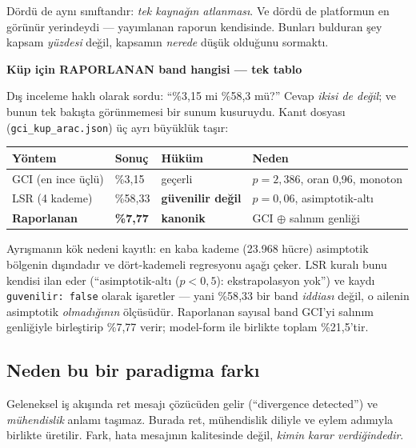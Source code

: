 \documentclass[11pt,a4paper]{article}
\newcommand{\kkkenar}{lacivert}
\newcommand{\kkzemin}{kod}
\newenvironment{renkkutu}[3]{%
  \renewcommand{\kkkenar}{#1}\renewcommand{\kkzemin}{#2}%
  \par\medskip\noindent
  \begin{lrbox}{\kutugovde}%
  \begin{minipage}{\dimexpr\linewidth-2\fboxsep-2\fboxrule\relax}\footnotesize
  \textcolor{#1}{\textbf{#3}}\par\vspace{3pt}%
}{%
  \end{minipage}%
  \end{lrbox}%
  \noindent\fcolorbox{\kkkenar}{\kkzemin}{\usebox{\kutugovde}}%
  \par\medskip
}
\newenvironment{anafikir}[1]{\begin{renkkutu}{lacivert}{kod}{#1}}{\end{renkkutu}}
\begin{document}
\noindent Dördü de aynı sınıftandır: \emph{tek kaynağın atlanması}. Ve dördü de
platformun en görünür yerindeydi --- yayımlanan raporun kendisinde. Bunları
bulduran şey kapsam \emph{yüzdesi} değil, kapsamın \emph{nerede} düşük olduğunu
sormaktı.

\begin{anafikir}{Küp için RAPORLANAN band hangisi --- tek tablo}
Dış inceleme haklı olarak sordu: ``\%3{,}15 mi \%58{,}3 mü?'' Cevap
\emph{ikisi de değil}; ve bunun tek bakışta görünmemesi bir sunum kusuruydu.
Kanıt dosyası (\texttt{gci\_kup\_arac.json}) üç ayrı büyüklük taşır:

\begin{center}\footnotesize
\begin{tabular}{@{}llll@{}}
\toprule
\textbf{Yöntem} & \textbf{Sonuç} & \textbf{Hüküm} & \textbf{Neden} \\
\midrule
GCI (en ince üçlü) & \%3{,}15 & geçerli & $p{=}2{,}386$, oran 0{,}96, monoton \\
LSR (4 kademe) & \%58{,}33 & \textbf{güvenilir değil} & $p{=}0{,}06$, asimptotik-altı \\
\textbf{Raporlanan} & \textbf{\%7{,}77} & \textbf{kanonik} & GCI $\oplus$ salınım genliği \\
\bottomrule
\end{tabular}
\end{center}

\noindent Ayrışmanın kök nedeni kayıtlı: en kaba kademe (23.968 hücre)
asimptotik bölgenin dışındadır ve dört-kademeli regresyonu aşağı çeker. LSR
kuralı bunu kendisi ilan eder (``asimptotik-altı ($p{<}0{,}5$): ekstrapolasyon
yok'') ve kaydı \texttt{guvenilir: false} olarak işaretler --- yani \%58{,}33
bir band \emph{iddiası} değil, o ailenin asimptotik \emph{olmadığının} ölçüsüdür.
Raporlanan sayısal band GCI'yi salınım genliğiyle birleştirip \%7{,}77 verir;
model-form ile birlikte toplam \%21{,}5'tir.
\end{anafikir}

\subsection*{Neden bu bir paradigma farkı}

Geleneksel iş akışında ret mesajı çözücüden gelir (``divergence detected'') ve
\emph{mühendislik} anlamı taşımaz. Burada ret, mühendislik diliyle ve eylem
adımıyla birlikte üretilir. Fark, hata mesajının kalitesinde değil,
\emph{kimin karar verdiğindedir}.
\end{document}
